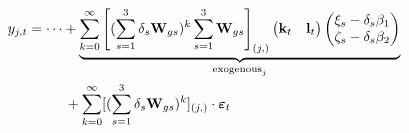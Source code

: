 \begin{align}
    y_{j,t}     &= \dots
                    + \underbrace{
                        \sum_{k=0}^\infty
                            \left[
                            (\sum_{s=1}^3 \delta_s \mathbf W_{gs})^k
                            \sum_{s=1}^3 \mathbf W_{gs}
                            \right]_{(j,)}
                            \begin{pmatrix}\mathbf k_t & \mathbf l_t\end{pmatrix}
                            \begin{pmatrix}
                                \xi_s-\delta_s\beta_1       \\
                                \zeta_s-\delta_s\beta_2
                            \end{pmatrix}
                    }_{\text{exogenous}_j}
                    \\ & \quad\ \ \quad \notag
                    + \sum_{k=0}^\infty
                        [
                            (\sum_{s=1}^3\delta_s \mathbf W_{gs})^k
                        ]_{(j,)} \cdot
                    \boldsymbol \varepsilon_t
\end{align}

